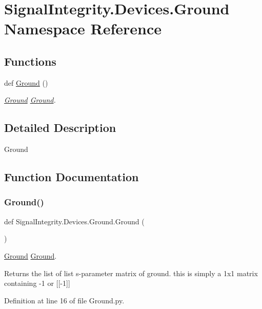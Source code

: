 \hypertarget{namespaceSignalIntegrity_1_1Devices_1_1Ground}{}\section{Signal\+Integrity.\+Devices.\+Ground Namespace Reference}
\label{namespaceSignalIntegrity_1_1Devices_1_1Ground}
\subsection*{Functions}
\begin{DoxyCompactItemize}
\item 
def \hyperlink{namespaceSignalIntegrity_1_1Devices_1_1Ground_a5533ec1a1b50e087bfe9027969ef1919}{Ground} ()
\begin{DoxyCompactList}\small\item\em \hyperlink{namespaceSignalIntegrity_1_1Devices_1_1Ground}{Ground} \hyperlink{namespaceSignalIntegrity_1_1Devices_1_1Ground}{Ground}. \end{DoxyCompactList}\end{DoxyCompactItemize}


\subsection{Detailed Description}
\begin{DoxyVerb}Ground\end{DoxyVerb}
 

\subsection{Function Documentation}
\mbox{\label{namespaceSignalIntegrity_1_1Devices_1_1Ground_a5533ec1a1b50e087bfe9027969ef1919}} 
\subsubsection{\texorpdfstring{Ground()}{Ground()}}
{\footnotesize\ttfamily def Signal\+Integrity.\+Devices.\+Ground.\+Ground (\begin{DoxyParamCaption}{ }\end{DoxyParamCaption})}



\hyperlink{namespaceSignalIntegrity_1_1Devices_1_1Ground}{Ground} \hyperlink{namespaceSignalIntegrity_1_1Devices_1_1Ground}{Ground}. 

\begin{DoxyReturn}{Returns}
the list of list s-\/parameter matrix of ground. this is simply a 1x1 matrix containing -\/1 or \mbox{[}\mbox{[}-\/1\mbox{]}\mbox{]} 
\end{DoxyReturn}


Definition at line 16 of file Ground.\+py.

